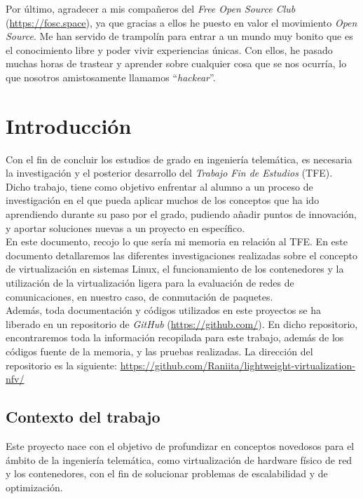 \documentclass[a4paper, oneside, 12pt]{book}
\begin{document}
	\noindent Por último, agradecer a mis compañeros del \textit{Free Open Source Club} (\url{https://fosc.space}), ya que gracias a ellos he puesto en valor el movimiento \textit{Open Source}. Me han servido de trampolín para entrar a un mundo muy bonito que es el conocimiento libre y poder vivir experiencias únicas. Con ellos, he pasado muchas horas de trastear y aprender sobre cualquier cosa que se nos ocurría, lo que nosotros amistosamente llamamos ``\textit{hackear}''. 
		
	\pagebreak
	
	\chapter{Introducción}
	
	\noindent Con el fin de concluir los estudios de grado en ingeniería telemática, es necesaria la investigación y el posterior desarrollo del \textit{Trabajo Fin de Estudios} (TFE). Dicho trabajo, tiene como objetivo enfrentar al alumno a un proceso de investigación en el que pueda aplicar muchos de los conceptos que ha ido aprendiendo durante su paso por el grado, pudiendo añadir puntos de innovación, y aportar soluciones nuevas a un proyecto en específico. \\
	
	\noindent En este documento, recojo lo que sería mi memoria en relación al TFE. En este documento detallaremos las diferentes investigaciones realizadas sobre el concepto de virtualización en sistemas Linux, el funcionamiento de los contenedores y la utilización de la virtualización ligera para la evaluación de redes de comunicaciones, en nuestro caso, de conmutación de paquetes. \\
	
	\noindent Además, toda documentación y códigos utilizados en este proyectos se ha liberado en un repositorio de \textit{GitHub} (\url{https://github.com/}). En dicho repositorio, encontraremos toda la información recopilada para este trabajo, además de los códigos fuente de la memoria, y las pruebas realizadas. La dirección del repositorio es la siguiente: \url{https://github.com/Raniita/lightweight-virtualization-nfv/}
	
	\section{Contexto del trabajo}
	\noindent Este proyecto nace con el objetivo de profundizar en conceptos novedosos para el ámbito de la ingeniería telemática, como virtualización de hardware físico de red y los contenedores, con el fin de solucionar problemas de escalabilidad y de optimización.\\
	
\end{document}
